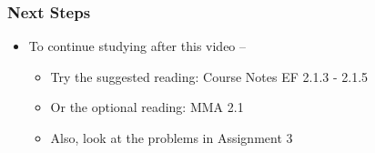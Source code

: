 \documentclass[10pt,english,aspectratio=169]{beamer}
\begin{document}
\begin{frame} \frametitle{Next Steps}

\begin{itemize}
\setlength\itemsep{5mm}
\item To continue studying after this video -- \vspace{2mm}

\begin{itemize}
 \setlength\itemsep{3mm}
 \item Try the suggested reading: Course Notes EF 2.1.3 - 2.1.5
 \item Or the optional reading: MMA 2.1
 \item Also, look at the problems in Assignment 3
\end{itemize}
\end{itemize}


\end{frame}
\end{document}
